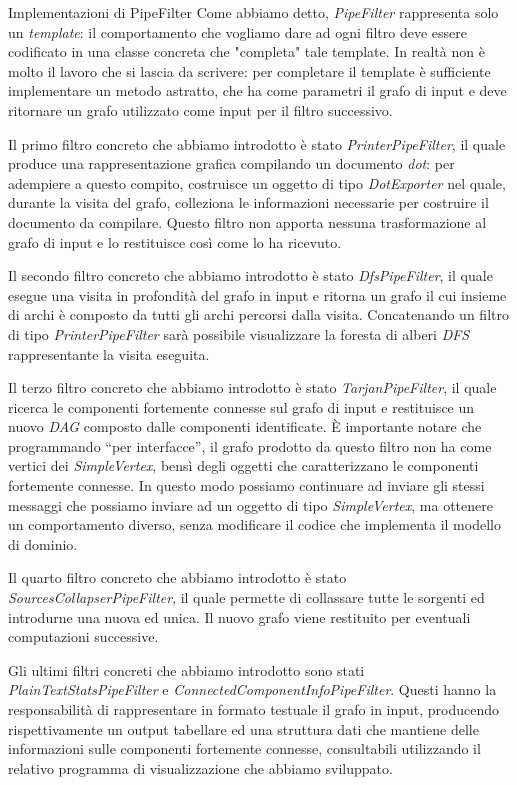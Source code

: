 \begin{paragraph}{Implementazioni di PipeFilter}
  Come abbiamo detto, \emph{PipeFilter} rappresenta solo un
  \emph{template}: il comportamento che vogliamo dare ad ogni filtro
  deve essere codificato in una classe concreta che "completa" tale
  template. In realt\`a non \`e molto il lavoro che si lascia da
  scrivere: per completare il template \`e sufficiente implementare un
  metodo astratto, che ha come parametri il grafo di input e deve
  ritornare un grafo utilizzato come input per il filtro successivo.

  Il primo filtro concreto che abbiamo introdotto \`e stato
  \emph{PrinterPipeFilter}, il quale produce una rappresentazione
  grafica compilando un documento \emph{dot}: per adempiere a questo
  compito, costruisce un oggetto di tipo \emph{DotExporter} nel quale,
  durante la visita del grafo, colleziona le informazioni necessarie
  per costruire il documento da compilare. Questo filtro non apporta
  nessuna trasformazione al grafo di input e lo restituisce cos\`i
  come lo ha ricevuto.

  Il secondo filtro concreto che abbiamo introdotto \`e stato
  \emph{DfsPipeFilter}, il quale esegue una visita in profondit\`a del
  grafo in input e ritorna un grafo il cui insieme di archi \`e
  composto da tutti gli archi percorsi dalla visita. Concatenando un
  filtro di tipo \emph{PrinterPipeFilter} sar\`a possibile
  visualizzare la foresta di alberi \emph{DFS} rappresentante la
  visita eseguita.

  Il terzo filtro concreto che abbiamo introdotto \`e stato
  \emph{TarjanPipeFilter}, il quale ricerca le componenti fortemente
  connesse sul grafo di input e restituisce un nuovo \emph{DAG}
  composto dalle componenti identificate. \`E importante notare che
  programmando ``per interfacce'', il grafo prodotto da questo filtro
  non ha come vertici dei \emph{SimpleVertex}, bens\`i degli oggetti
  che caratterizzano le componenti fortemente connesse. In questo modo
  possiamo continuare ad inviare gli stessi messaggi che possiamo
  inviare ad un oggetto di tipo \emph{SimpleVertex}, ma ottenere un
  comportamento diverso, senza modificare il codice che implementa il
  modello di dominio.

  Il quarto filtro concreto che abbiamo introdotto \`e stato
  \emph{SourcesCollapserPipeFilter}, il quale permette di collassare
  tutte le sorgenti ed introdurne una nuova ed unica. Il nuovo grafo
  viene restituito per eventuali computazioni successive.

  Gli ultimi filtri concreti che abbiamo introdotto sono stati
  \emph{PlainTextStatsPipeFilter} e
  \emph{ConnectedComponentInfoPipeFilter}. Questi hanno la
  responsabilit\`a di rappresentare in formato testuale il grafo in
  input, producendo rispettivamente un output tabellare ed una
  struttura dati che mantiene delle informazioni sulle componenti
  fortemente connesse, consultabili utilizzando il relativo programma
  di visualizzazione che abbiamo sviluppato.

\end{paragraph}

